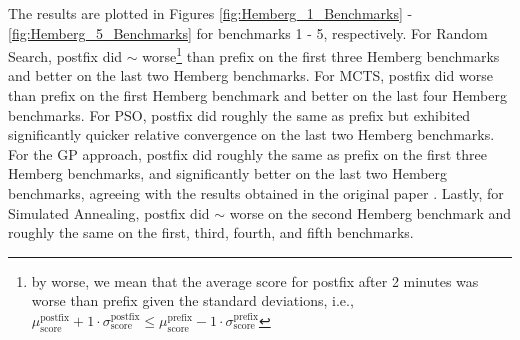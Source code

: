 \documentclass[12pt]{iopart}
\begin{document}
\par The results are plotted in Figures \ref{fig:Hemberg_1_Benchmarks} - \ref{fig:Hemberg_5_Benchmarks} for benchmarks 1 - 5, respectively. For Random Search, postfix did $\sim$ worse\footnote{by worse, we mean that the average score for postfix after 2 minutes was worse than prefix given the standard deviations, i.e., $\mu_\mathrm{score}^\mathrm{postfix} + 1\cdot \sigma_\mathrm{score}^\mathrm{postfix} \leq \mu_\mathrm{score}^\mathrm{prefix} - 1\cdot \sigma_\mathrm{score}^\mathrm{prefix}$} than prefix on the first three Hemberg benchmarks and better on the last two Hemberg benchmarks. For MCTS, postfix did worse than prefix on the first Hemberg benchmark and better on the last four Hemberg benchmarks. For PSO, postfix did roughly the same as prefix but exhibited significantly quicker relative convergence on the last two Hemberg benchmarks. For the GP approach, postfix did roughly the same as prefix on the first three Hemberg benchmarks, and significantly better on the last two Hemberg benchmarks, agreeing with the results obtained in the original paper \cite{hemberg2008pre}. Lastly, for Simulated Annealing, postfix did $\sim$ worse on the second Hemberg benchmark and roughly the same on the first, third, fourth, and fifth benchmarks. 
\end{document}

